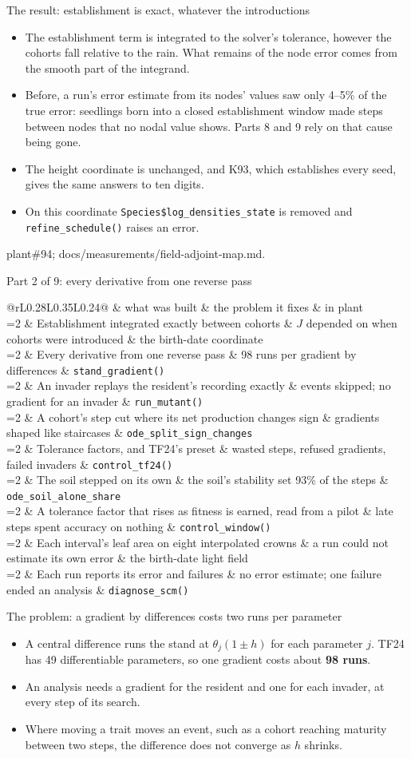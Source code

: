 \documentclass[aspectratio=169,10pt]{beamer}
\makeatletter
\newcommand{\src}[1]{\par\vfill{\tiny\color{quiet} #1}}
\newcommand{\rmrow}[4]{%
  \ifnum#1=\rmcurrent \rowcolor{wash}\fi
  #1 & #2 & #3 & #4 \\}
\newcommand{\roadmap}[1]{%
  \def\rmcurrent{#1}%
  \footnotesize
  \begin{tabular}{@{}rL{0.28\textwidth}L{0.35\textwidth}L{0.24\textwidth}@{}}
    \toprule
    & what was built & the problem it fixes & in plant \\
    \midrule
    \rmrow{1}{Establishment integrated exactly between cohorts}{$J$ depended on when cohorts were introduced}{the birth-date coordinate}
    \rmrow{2}{Every derivative from one reverse pass}{98 runs per gradient by differences}{\texttt{stand\_gradient()}}
    \rmrow{3}{An invader replays the resident's recording exactly}{events skipped; no gradient for an invader}{\texttt{run\_mutant()}}
    \rmrow{4}{A cohort's step cut where its net production changes sign}{gradients shaped like staircases}{\texttt{ode\_split\_sign\_changes}}
    \rmrow{5}{Tolerance factors, and TF24's preset}{wasted steps, refused gradients, failed invaders}{\texttt{control\_tf24()}}
    \rmrow{6}{The soil stepped on its own}{the soil's stability set 93\% of the steps}{\texttt{ode\_soil\_alone\_share}}
    \rmrow{7}{A tolerance factor that rises as fitness is earned, read from a pilot}{late steps spent accuracy on nothing}{\texttt{control\_window()}}
    \rmrow{8}{Each interval's leaf area on eight interpolated crowns}{a run could not estimate its own error}{the birth-date light field}
    \rmrow{9}{Each run reports its error and failures}{no error estimate; one failure ended an analysis}{\texttt{diagnose\_scm()}}
    \bottomrule
  \end{tabular}}
\makeatother
\begin{document}
\begin{frame}{The result: establishment is exact, whatever the introductions}
  \small
  \begin{itemize}
    \item The establishment term is integrated to the solver's tolerance, however the cohorts
      fall relative to the rain. What remains of the node error comes from the smooth part
      of the integrand.
    \item Before, a run's error estimate from its nodes' values saw only 4--5\% of the true
      error: seedlings born into a closed establishment window made steps between nodes
      that no nodal value shows. Parts 8 and 9 rely on that cause being gone.
    \item The height coordinate is unchanged, and K93, which establishes every seed, gives the
      same answers to ten digits.
    \item On this coordinate \texttt{Species\$log\_densities\_state} is removed and
      \texttt{refine\_schedule()} raises an error.
  \end{itemize}
  \src{plant\#94; docs/measurements/field-adjoint-map.md.}
\end{frame}

\begin{frame}{Part 2 of 9: every derivative from one reverse pass}
  \roadmap{2}
\end{frame}

\begin{frame}{The problem: a gradient by differences costs two runs per parameter}
  \small
  \begin{itemize}
    \item A central difference runs the stand at $\theta_j(1 \pm h)$ for each parameter $j$. TF24
      has 49 differentiable parameters, so one gradient costs about \textbf{98 runs}.
    \item An analysis needs a gradient for the resident and one for each invader, at every
      step of its search.
    \item Where moving a trait moves an event, such as a cohort reaching maturity between two
      steps, the difference does not converge as $h$ shrinks.
  \end{itemize}
\end{frame}
\end{document}
